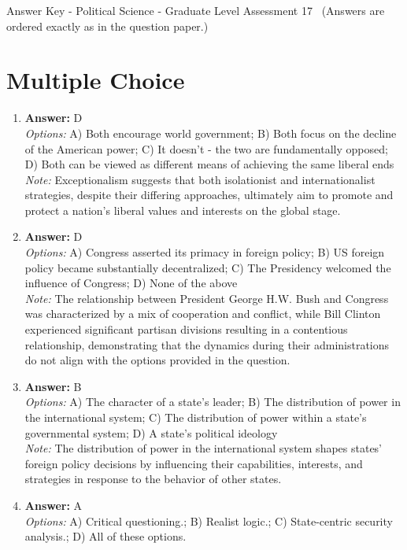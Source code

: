\documentclass[12pt]{article}
\begin{document}
\begin{center}
Answer Key - Political Science - Graduate Level Assessment 17 \
\small (Answers are ordered exactly as in the question paper.)
\end{center}

\section*{Multiple Choice}
\begin{enumerate}[label=\arabic*.]
\item \textbf{Answer:} D
\\ \textit{Options:} A) Both encourage world government; B) Both focus on the decline of the American power; C) It doesn't - the two are fundamentally opposed; D) Both can be viewed as different means of achieving the same liberal ends
\\ \textit{Note:} Exceptionalism suggests that both isolationist and internationalist strategies, despite their differing approaches, ultimately aim to promote and protect a nation's liberal values and interests on the global stage.
\item \textbf{Answer:} D
\\ \textit{Options:} A) Congress asserted its primacy in foreign policy; B) US foreign policy became substantially decentralized; C) The Presidency welcomed the influence of Congress; D) None of the above
\\ \textit{Note:} The relationship between President George H.W. Bush and Congress was characterized by a mix of cooperation and conflict, while Bill Clinton experienced significant partisan divisions resulting in a contentious relationship, demonstrating that the dynamics during their administrations do not align with the options provided in the question.
\item \textbf{Answer:} B
\\ \textit{Options:} A) The character of a state's leader; B) The distribution of power in the international system; C) The distribution of power within a state's governmental system; D) A state's political ideology
\\ \textit{Note:} The distribution of power in the international system shapes states' foreign policy decisions by influencing their capabilities, interests, and strategies in response to the behavior of other states.
\item \textbf{Answer:} A
\\ \textit{Options:} A) Critical questioning.; B) Realist logic.; C) State-centric security analysis.; D) All of these options.

\end{enumerate}
\end{document}
